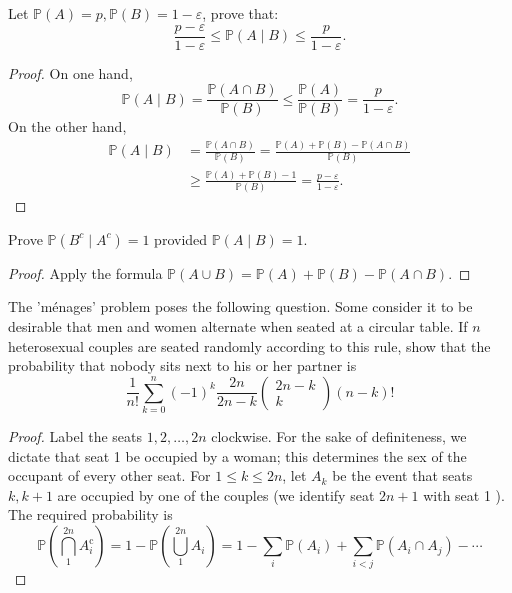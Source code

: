 \documentclass[11pt,singlecolumn, openany, citestyle=authoryear]{elegantbook}
\begin{document}
\begin{CJK}{UTF8}{gbsn}
\begin{exercise}
    Let $\mathbb{P}(A)=p,\mathbb{P}(B)=1-\varepsilon$, prove that:
    $$
    \frac{p-\varepsilon}{1 - \varepsilon} \leqslant \mathbb{P}(A \mid B)\leqslant
    \frac{p}{1-\varepsilon}.
    $$
\end{exercise}
\begin{proof}
    On one hand, 
    $$
    \mathbb{P}(A \mid B) = \frac{\mathbb{P}(A \cap B)}{\mathbb{P}(B)}\leqslant
    \frac{\mathbb{P}(A)}{\mathbb{P}(B)} = \frac{p}{1-\varepsilon}.
    $$    
    On the other hand,
    \begin{align*}
        \mathbb{P}(A \mid B) & = \frac{\mathbb{P}(A \cap B)}{\mathbb{P}(B)} = 
        \frac{\mathbb{P}(A) + \mathbb{P}(B)-\mathbb{P}(A \cap B)}{\mathbb{P}(B)}\\
        & \geqslant
        \frac{\mathbb{P}(A) + \mathbb{P}(B)-1}{\mathbb{P}(B)}
        = \frac{p-\varepsilon}{1-\varepsilon}.
    \end{align*}
\end{proof}

\begin{exercise}
    Prove $\mathbb{P}(B^c \mid A^c)=1$ provided $\mathbb{P}(A\mid B)=1$.
\end{exercise}
\begin{proof}
    Apply the formula $\mathbb{P}(A\cup B) = \mathbb{P}(A)+\mathbb{P}(B) - \mathbb{P}(A \cap B)$.
\end{proof}

\begin{exercise}
    The 'ménages' problem poses the following question. Some consider it to be desirable that men and women alternate when seated at a circular table. If $n$ heterosexual couples are seated randomly according to this rule, show that the probability that nobody sits next to his or her partner is
$$
\frac{1}{n !} \sum_{k=0}^n(-1)^k \frac{2 n}{2 n-k}\left(\begin{array}{c}
2 n-k \\
k
\end{array}\right)(n-k) !
$$
\end{exercise}

\begin{proof}
    Label the seats $1,2, \ldots, 2 n$ clockwise. For the sake of definiteness, we dictate that seat 1 be occupied by a woman; this determines the sex of the occupant of every other seat. For $1 \leq k \leq 2 n$, let $A_k$ be the event that seats $k, k+1$ are occupied by one of the couples (we identify seat $2 n+1$ with seat 1 ). The required probability is
    $$
    \mathbb{P}\left(\bigcap_1^{2 n} A_i^{\mathrm{c}}\right)=1-\mathbb{P}\left(\bigcup_1^{2 n} A_i\right)=1-\sum_i \mathbb{P}\left(A_i\right)+\sum_{i<j} \mathbb{P}\left(A_i \cap A_j\right)-\cdots
    $$
    

\end{proof}
\end{CJK}
\end{document}
